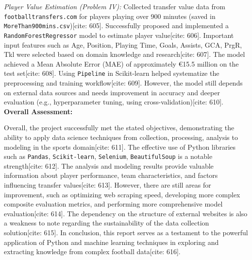 \documentclass[12pt]{report}
\begin{document}
{{{{\textit{Player Value Estimation (Problem IV):} Collected transfer value data from \texttt{footballtransfers.com} for players playing over 900 minutes (saved in \texttt{MoreThan900mins.csv})[cite: 605]. Successfully proposed and implemented a \texttt{RandomForestRegressor} model to estimate player value[cite: 606]. Important input features such as Age, Position, Playing Time, Goals, Assists, GCA, PrgR, Tkl were selected based on domain knowledge and research[cite: 607]. The model achieved a Mean Absolute Error (MAE) of approximately €15.5 million on the test set[cite: 608]. Using \texttt{Pipeline} in Scikit-learn helped systematize the preprocessing and training workflow[cite: 609]. However, the model still depends on external data sources and needs improvement in accuracy and deeper evaluation (e.g., hyperparameter tuning, using cross-validation)[cite: 610].
\vspace{1em}
\noindent
\textbf{Overall Assessment:}

\vspace{0.5em}
\noindent
Overall, the project successfully met the stated objectives, demonstrating the ability to apply data science techniques from collection, processing, analysis to modeling in the sports domain[cite: 611]. The effective use of Python libraries such as \texttt{Pandas}, \texttt{Scikit-learn}, \texttt{Selenium}, \texttt{BeautifulSoup} is a notable strength[cite: 612]. The analysis and modeling results provide valuable information about player performance, team characteristics, and factors influencing transfer values[cite: 613].
\vspace{0.5em}
\noindent
However, there are still areas for improvement, such as optimizing web scraping speed, developing more complex composite evaluation metrics, and performing more comprehensive model evaluation[cite: 614]. The dependency on the structure of external websites is also a weakness to note regarding the sustainability of the data collection solution[cite: 615].
\vspace{0.5em}
\noindent
In conclusion, this report serves as a testament to the powerful application of Python and machine learning techniques in exploring and extracting knowledge from complex football data[cite: 616].
}

}}}
\end{document}

